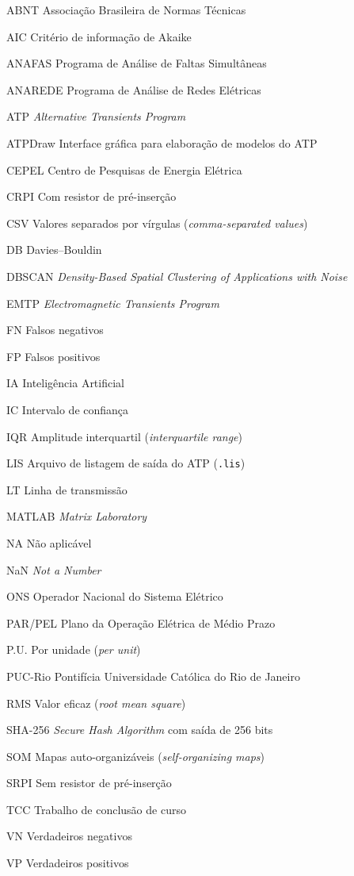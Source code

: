 \documentclass[
	12pt,				%
	openright,			%
	oneside,			%
	a4paper,			%
	chapter=TITLE,		%
	section=TITLE,		%
	subsection=TITLE,	%
	subsubsection=TITLE,%
	english,			%
	brazilian			%
	]{abntex2}
\theoremstyle{definition}
\begin{document}
\begin{siglas}
  \item[ABNT] Associação Brasileira de Normas Técnicas
  \item[AIC] Critério de informação de Akaike
  \item[ANAFAS] Programa de Análise de Faltas Simultâneas
  \item[ANAREDE] Programa de Análise de Redes Elétricas
  \item[ATP] \textit{Alternative Transients Program}
  \item[ATPDraw] Interface gráfica para elaboração de modelos do ATP
  \item[CEPEL] Centro de Pesquisas de Energia Elétrica
  \item[CRPI] Com resistor de pré-inserção
  \item[CSV] Valores separados por vírgulas (\textit{comma-separated values})
  \item[DB] Davies--Bouldin
  \item[DBSCAN] \textit{Density-Based Spatial Clustering of Applications with Noise}
  \item[EMTP] \textit{Electromagnetic Transients Program}
  \item[FN] Falsos negativos
  \item[FP] Falsos positivos
  \item[IA] Inteligência Artificial
  \item[IC] Intervalo de confiança
  \item[IQR] Amplitude interquartil (\textit{interquartile range})
  \item[LIS] Arquivo de listagem de saída do ATP (\texttt{.lis})
  \item[LT] Linha de transmissão
  \item[MATLAB] \textit{Matrix Laboratory}
  \item[NA] Não aplicável
  \item[NaN] \textit{Not a Number}
  \item[ONS] Operador Nacional do Sistema Elétrico
  \item[PAR/PEL] Plano da Operação Elétrica de Médio Prazo
  \item[P.U.] Por unidade (\textit{per unit})
  \item[PUC-Rio] Pontifícia Universidade Católica do Rio de Janeiro
  \item[RMS] Valor eficaz (\textit{root mean square})
  \item[SHA-256] \textit{Secure Hash Algorithm} com saída de 256 bits
  \item[SOM] Mapas auto-organizáveis (\textit{self-organizing maps})
  \item[SRPI] Sem resistor de pré-inserção
  \item[TCC] Trabalho de conclusão de curso
  \item[VN] Verdadeiros negativos
  \item[VP] Verdadeiros positivos
\end{siglas}
\end{document}
